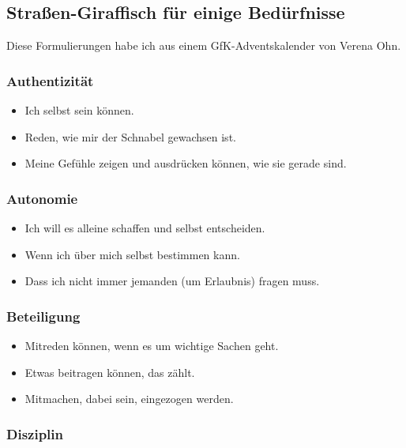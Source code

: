 \subsection{Straßen-Giraffisch für einige Bedürfnisse}

Diese Formulierungen habe ich aus einem GfK-Adventskalender von Verena Ohn. \cite{verena-ohn}

\subsubsection{Authentizität}

\begin{itemize}
    \item Ich selbst sein können.
    \item Reden, wie mir der Schnabel gewachsen ist.
    \item Meine Gefühle zeigen und ausdrücken können, wie sie gerade sind.
\end{itemize}

\subsubsection{Autonomie}

\begin{itemize}
    \item Ich will es alleine schaffen und selbst entscheiden.
    \item Wenn ich über mich selbst bestimmen kann.
    \item Dass ich nicht immer jemanden (um Erlaubnis) fragen muss.
\end{itemize}

\subsubsection{Beteiligung}

\begin{itemize}
    \item Mitreden können, wenn es um wichtige Sachen geht.
    \item Etwas beitragen können, das zählt.
    \item Mitmachen, dabei sein, eingezogen werden.
\end{itemize}

\subsubsection{Disziplin}


